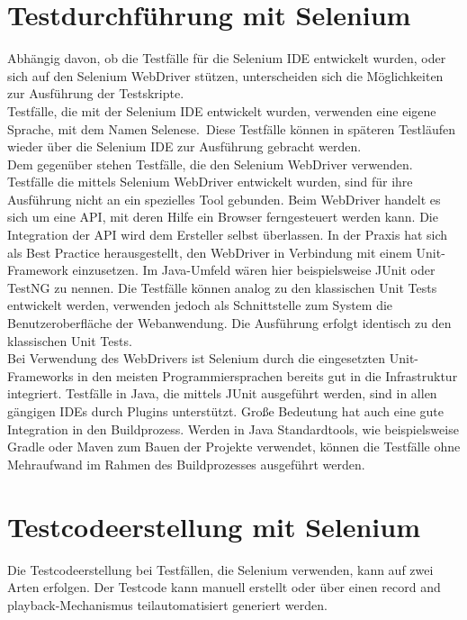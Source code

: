 \section{Testdurchführung mit Selenium}
\label{sec:testdurchführung_mit_selenium}
Abhängig davon, ob die Testfälle für die Selenium IDE entwickelt wurden, oder sich auf den Selenium WebDriver stützen, unterscheiden sich die Möglichkeiten zur Ausführung der Testskripte.\\
Testfälle, die mit der Selenium IDE entwickelt wurden, verwenden eine eigene Sprache, mit dem Namen \grq Selenese\grq.\ Diese Testfälle können in späteren Testläufen wieder über die Selenium IDE zur Ausführung gebracht werden. \\
Dem gegenüber stehen Testfälle, die den Selenium WebDriver verwenden.
Testfälle die mittels Selenium WebDriver entwickelt wurden, sind für ihre Ausführung nicht an ein spezielles Tool gebunden. Beim WebDriver handelt es sich um eine API, mit deren Hilfe ein Browser ferngesteuert werden kann. Die Integration der API wird dem Ersteller selbst überlassen. In der Praxis hat sich als Best Practice herausgestellt, den WebDriver in Verbindung mit einem Unit-Framework einzusetzen.
Im Java-Umfeld wären hier beispielsweise JUnit oder TestNG zu nennen.
Die Testfälle können analog zu den klassischen Unit Tests entwickelt werden, verwenden jedoch als Schnittstelle zum System die Benutzeroberfläche der Webanwendung. 
Die Ausführung erfolgt identisch zu den klassischen Unit Tests.\\
Bei Verwendung des WebDrivers ist Selenium durch die eingesetzten Unit-Frameworks in den meisten Programmiersprachen bereits gut in die Infrastruktur integriert. Testfälle in Java, die mittels JUnit ausgeführt werden, sind in allen gängigen IDEs durch Plugins unterstützt. Große Bedeutung hat auch eine gute Integration in den Buildprozess. Werden in Java Standardtools, wie beispielsweise Gradle oder Maven zum Bauen der Projekte verwendet, können die Testfälle ohne Mehraufwand im Rahmen des Buildprozesses ausgeführt werden.



\section{Testcodeerstellung mit Selenium}
\label{sec:Testdesign}
Die Testcodeerstellung bei Testfällen, die Selenium verwenden, kann auf zwei Arten erfolgen.
Der Testcode kann manuell erstellt oder über einen \grq record and playback\grq -Mechanismus teilautomatisiert generiert werden.


